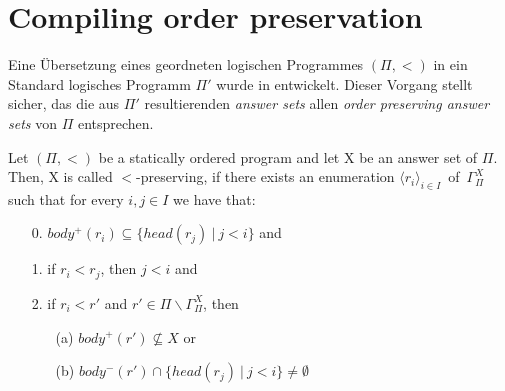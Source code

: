 \section{Compiling order preservation}
\label{sec:order}

Eine Übersetzung eines geordneten logischen Programmes $(\Pi, <)$ in ein
Standard logisches Programm $\Pi'$ wurde in \cite{delgrande2000logic} entwickelt.
Dieser Vorgang stellt sicher, das die aus $\Pi'$ resultierenden \emph{answer sets}
allen \emph{order preserving answer sets} von $\Pi$ entsprechen.

\begin{definition}
  Let $(\Pi, <)$ be a statically ordered program and let X be an answer set of $\Pi$.
  Then, X is called $<$-preserving, if there exists an enumeration
  $\langle r_i \rangle_{i \in I}$~of~$\Gamma_{\Pi}^X$ such that for every $i, j \in I$
  we have that:
  \begin{itemize}
    \item[0.] $body^+(r_i) \subseteq \{ head(r_j)~|~j<i\}$ and \\
    \item[1.] if $r_i < r_j$, then $j<i$ and \\
    \item[2.] if $r_i < r'$ and $r' \in \Pi \backslash \Gamma_{\Pi}^X$, then
      \begin{itemize}
        \item[(a)] $body^+(r') \not \subseteq X$ or
        \item[(b)] $body^-(r') \cap \{head(r_j)~|~j<i\} \not = \emptyset$
      \end{itemize}
  \end{itemize}
  \label{def:2}
\end{definition}

